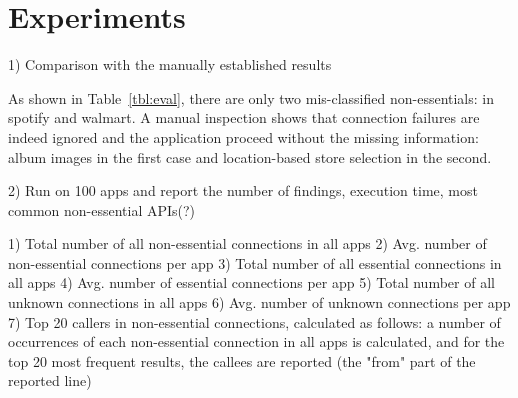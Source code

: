 \section{Experiments}
\label{sec:evaluation}


1) Comparison with the manually established results

As shown in Table~\ref{tbl:eval}, there are only two mis-classified non-essentials: in spotify and walmart. A manual inspection shows that connection failures are indeed ignored and the application proceed without the missing information: album images in the first case and location-based store selection in the second.



2) Run on 100 apps and report the number of findings, execution time, most common non-essential APIs(?) 

\begin{table}[t]
\caption{Analysis of xx Top-Popular Application from GooglePlay.}
\label{tbl:googlePlayApps}
\centering
\tabcolsep=1.5pt
\end{table}


1) Total number of all non-essential connections in all apps
2) Avg. number of non-essential connections per app
3) Total number of all essential connections in all apps
4) Avg. number of essential connections per app
5) Total number of all unknown connections in all apps
6) Avg. number of unknown connections per app
7) Top 20 callers in non-essential connections, calculated as follows:
a number of occurrences of each non-essential connection in all apps
is calculated, and for the top 20 most frequent results, the callees
are reported (the "from" part of the reported line)
